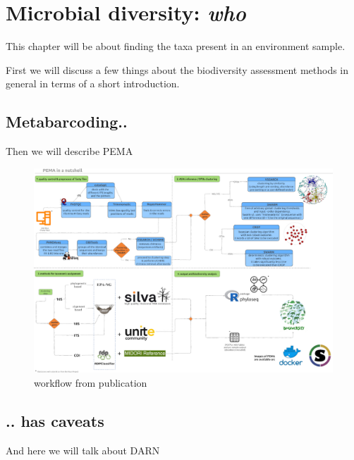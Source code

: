 
\chapter{Microbial diversity: \textit{who}}
\label{cha:2}

This chapter will be about finding the taxa present in an environment sample. 

First we will discuss a few things about the biodiversity assessment methods in general in terms of a short introduction. 


\section{Metabarcoding..}
Then we will describe PEMA~\cite{zafeiropoulos2020pema}


\begin{figure}{}
   \centering
   \includegraphics{figures/pema_workflow.jpeg}
   \caption{workflow from publication}
\end{figure}




\section{.. has caveats}

And here we will talk about DARN


